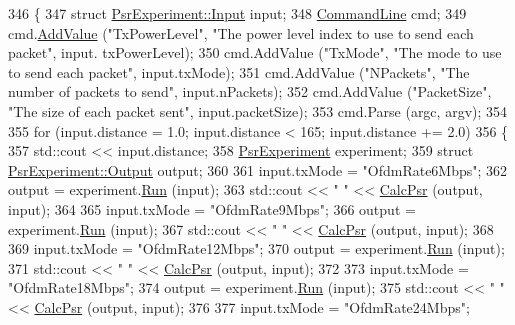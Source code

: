 \begin{DoxyCode}
346 \{
347   \textcolor{keyword}{struct }\hyperlink{structPsrExperiment_1_1Input}{PsrExperiment::Input} input;
348   \hyperlink{classns3_1_1CommandLine}{CommandLine} cmd;
349   cmd.\hyperlink{classns3_1_1CommandLine_addcfb546c7ad4c8bd0965654d55beb8e}{AddValue} (\textcolor{stringliteral}{"TxPowerLevel"}, \textcolor{stringliteral}{"The power level index to use to send each packet"}, input.
      txPowerLevel);
350   cmd.AddValue (\textcolor{stringliteral}{"TxMode"}, \textcolor{stringliteral}{"The mode to use to send each packet"}, input.txMode);
351   cmd.AddValue (\textcolor{stringliteral}{"NPackets"}, \textcolor{stringliteral}{"The number of packets to send"}, input.nPackets);
352   cmd.AddValue (\textcolor{stringliteral}{"PacketSize"}, \textcolor{stringliteral}{"The size of each packet sent"}, input.packetSize);
353   cmd.Parse (argc, argv);
354 
355   \textcolor{keywordflow}{for} (input.distance = 1.0; input.distance < 165; input.distance += 2.0)
356     \{
357       std::cout << input.distance;
358       \hyperlink{classPsrExperiment}{PsrExperiment} experiment;
359       \textcolor{keyword}{struct }\hyperlink{structPsrExperiment_1_1Output}{PsrExperiment::Output} output;
360 
361       input.txMode = \textcolor{stringliteral}{"OfdmRate6Mbps"};
362       output = experiment.\hyperlink{classPsrExperiment_abf2ccba462f7c6741034fcadcdd45900}{Run} (input);
363       std::cout << \textcolor{stringliteral}{" "} << \hyperlink{wifi-phy-test_8cc_a90b8a55ba4147ccdea2d6387caf9f032}{CalcPsr} (output, input);
364 
365       input.txMode = \textcolor{stringliteral}{"OfdmRate9Mbps"};
366       output = experiment.\hyperlink{classPsrExperiment_abf2ccba462f7c6741034fcadcdd45900}{Run} (input);
367       std::cout << \textcolor{stringliteral}{" "} << \hyperlink{wifi-phy-test_8cc_a90b8a55ba4147ccdea2d6387caf9f032}{CalcPsr} (output, input);
368 
369       input.txMode = \textcolor{stringliteral}{"OfdmRate12Mbps"};
370       output = experiment.\hyperlink{classPsrExperiment_abf2ccba462f7c6741034fcadcdd45900}{Run} (input);
371       std::cout << \textcolor{stringliteral}{" "} << \hyperlink{wifi-phy-test_8cc_a90b8a55ba4147ccdea2d6387caf9f032}{CalcPsr} (output, input);
372 
373       input.txMode = \textcolor{stringliteral}{"OfdmRate18Mbps"};
374       output = experiment.\hyperlink{classPsrExperiment_abf2ccba462f7c6741034fcadcdd45900}{Run} (input);
375       std::cout << \textcolor{stringliteral}{" "} << \hyperlink{wifi-phy-test_8cc_a90b8a55ba4147ccdea2d6387caf9f032}{CalcPsr} (output, input);
376 
377       input.txMode = \textcolor{stringliteral}{"OfdmRate24Mbps"};

\end{DoxyCode}
